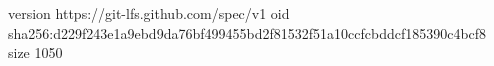version https://git-lfs.github.com/spec/v1
oid sha256:d229f243e1a9ebd9da76bf499455bd2f81532f51a10ccfcbddcf185390c4bcf8
size 1050
